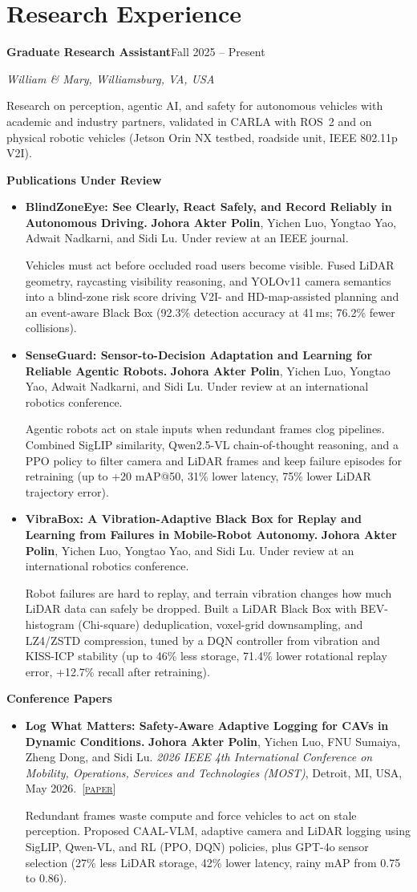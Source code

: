 \documentclass[11pt,letterpaper]{article}
\newcommand{\me}{\textbf{Johora Akter Polin}}
\newcommand{\paperlink}[1]{~\mbox{[\href{#1}{\textsc{paper}}]}}
\newcommand{\cventry}[4]{%
  \textbf{#1}\hfill #2\par\nobreak
  \textit{#3}\hfill #4\par}
\newcommand{\pubgroup}[1]{\par\textbf{#1}\par\nobreak}
\newcommand{\pubgap}{\par\vspace{6pt}}
\newcommand{\paperitem}[4]{%
  \item[{[#1]}] \textbf{#2.} {\small #3}\par
  \vspace{1pt}#4}
\begin{document}
\section{Research Experience}
\cventry{Graduate Research Assistant}{Fall 2025 -- Present}
        {William \& Mary, Williamsburg, VA, USA}{}
Research on perception, agentic AI, and safety for autonomous vehicles with
academic and industry partners, validated in CARLA with ROS~2 and on physical
robotic vehicles (Jetson Orin NX testbed, roadside unit, IEEE 802.11p V2I).
\par\vspace{5pt}
\pubgroup{Publications Under Review}
\begin{itemize}[publist]
  \paperitem{U1}{BlindZoneEye: See Clearly, React Safely, and Record Reliably
    in Autonomous Driving}
    {\me, Yichen Luo, Yongtao Yao, Adwait Nadkarni, and Sidi Lu.
    Under review at an IEEE journal.}
    {Vehicles must act before occluded road users become visible. Fused LiDAR
    geometry, raycasting visibility reasoning, and YOLOv11 camera semantics
    into a blind-zone risk score driving V2I- and HD-map-assisted planning and an event-aware Black Box (92.3\% detection
    accuracy at 41\,ms; 76.2\% fewer collisions).}
  \paperitem{U2}{SenseGuard: Sensor-to-Decision Adaptation and Learning for
    Reliable Agentic Robots}
    {\me, Yichen Luo, Yongtao Yao, Adwait Nadkarni, and Sidi Lu.
    Under review at an international robotics conference.}
    {Agentic robots act on stale inputs when redundant frames clog
    pipelines. Combined SigLIP similarity, Qwen2.5-VL chain-of-thought
    reasoning, and a PPO policy to filter camera and LiDAR frames and keep
    failure episodes for retraining (up to +20 mAP@50, 31\% lower latency,
    75\% lower LiDAR trajectory error).}
  \paperitem{U3}{VibraBox: A Vibration-Adaptive Black Box for Replay and
    Learning from Failures in Mobile-Robot Autonomy}
    {\me, Yichen Luo, Yongtao Yao, and Sidi Lu.
    Under review at an international robotics conference.}
    {Robot failures are hard to replay, and terrain vibration changes how much
    LiDAR data can safely be dropped. Built a LiDAR Black Box with
    BEV-histogram (Chi-square) deduplication, voxel-grid downsampling, and
    LZ4/ZSTD compression, tuned by a DQN controller from vibration and KISS-ICP
    stability (up to 46\% less storage, 71.4\% lower rotational replay error,
    +12.7\% recall after retraining).}
\end{itemize}
\pubgap
\pubgroup{Conference Papers}
\begin{itemize}[publist]
  \paperitem{C1}{Log What Matters: Safety-Aware Adaptive Logging for CAVs in
    Dynamic Conditions}
    {\me, Yichen Luo, FNU Sumaiya, Zheng Dong, and Sidi Lu. \textit{2026 IEEE
    4th International Conference on Mobility, Operations, Services and
    Technologies (MOST)}, Detroit, MI, USA, May
    2026.\paperlink{https://sidilu.org/paper/AdaptiveLogAsInput_MOST26.pdf}}
    {Redundant frames waste compute and force vehicles to act on stale
    perception. Proposed CAAL-VLM, adaptive camera and LiDAR logging
    using SigLIP, Qwen-VL, and RL (PPO, DQN) policies, plus GPT-4o sensor
    selection (27\% less LiDAR storage, 42\% lower latency, rainy mAP from
    0.75 to 0.86).}
\end{itemize}
\end{document}
